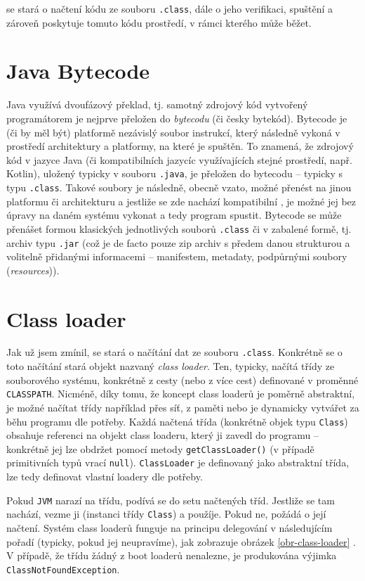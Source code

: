  se stará o načtení kódu ze souboru \texttt{.class}, dále o jeho verifikaci, spuštění a zároveň poskytuje tomuto kódu prostředí, v rámci kterého může běžet.

\section{Java Bytecode}
Java využívá dvoufázový překlad, tj. samotný zdrojový kód vytvořený programátorem je nejprve přeložen do \textit{bytecodu} (či česky bytekód). Bytecode je (či by měl být) platformě nezávislý soubor instrukcí, který následně  vykoná v prostředí architektury a platformy, na které je spuštěn. To znamená, že zdrojový kód v jazyce Java (či kompatibilních jazycíc využívajících stejné prostředí, např. Kotlin), uložený typicky v souboru \texttt{.java}, je přeložen do bytecodu -- typicky s typu \texttt{.class}. Takové soubory je následně, obecně vzato, možné přenést na jinou platformu či architekturu a jestliže se zde nachází kompatibilní , je možné jej bez úpravy na daném systému vykonat a tedy program spustit. Bytecode se může přenášet formou klasických jednotlivých souborů \texttt{.class} či v zabalené formě, tj. archiv typu \texttt{.jar} (což je de facto pouze zip archiv s předem danou strukturou a volitelně přidanými informacemi -- manifestem, metadaty, podpůrnými soubory (\textit{resources})).

\section{Class loader}
Jak už jsem zmínil,  se stará o načítání dat ze souboru \texttt{.class}. Konkrétně se o toto načítání stará objekt nazvaný \textit{class loader}. Ten, typicky, načítá třídy ze souborového systému, konkrétně z cesty (nebo z více cest) definované v proměnné \texttt{CLASSPATH}. Nicméně, díky tomu, že koncept class loaderů je poměrně abstraktní, je možné načítat třídy například přes síť, z paměti nebo je dynamicky vytvářet za běhu programu dle potřeby. Každá načtená třída (konkrétně objek typu \texttt{Class}) obsahuje referenci na objekt class loaderu, který ji zavedl do programu -- konkrétně jej lze obdržet pomocí metody \texttt{getClassLoader()} (v případě primitivních typů vrací \texttt{null}). \texttt{ClassLoader} je definovaný jako abstraktní třída, lze tedy definovat vlastní loadery dle potřeby. 

Pokud \texttt{JVM} narazí na třídu, podívá se do setu načtených tříd. Jestliže se tam nachází, vezme ji (instanci třídy \texttt{Class}) a použíje. Pokud ne, požádá o její načtení. Systém class loaderů funguje na principu delegování v následujícím pořadí (typicky, pokud jej neupravíme), jak zobrazuje obrázek \ref{obr-class-loader} \cite{class-loader} \cite{class-loader-hierarchy}. V případě, že třídu žádný z boot loaderů nenalezne, je produkována výjimka \texttt{ClassNotFoundException}. 

